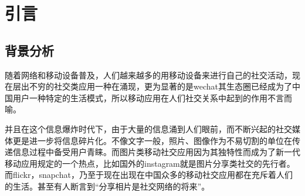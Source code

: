 
\chapter{引言}
\section{背景分析}
随着网络和移动设备普及，人们越来越多的用移动设备来进行自己的社交活动，现在层出不穷的社交类应用一种在涌现，更为显著的是wechat其生态圈已经成为了中国用户一种特定的生活模式，所以移动应用在人们社交关系中起到的作用不言而喻。

并且在这个信息爆炸时代下，由于大量的信息涌到人们眼前，而不断兴起的社交媒体更是进一步将信息碎片化。不像文字一般，照片、图像作为不易切割的单位在传递信息过程中备受用户青睐。而图片类移动社交应用因为其独特性而成为了新一代移动应用规定的一个热点，比如国外的instagram就是图片分享类社交的先行者。而flickr，snapchat，乃至于现在出现在中国众多的移动社交应用都在充斥着人们的生活。甚至有人断言到“分享相片是社交网络的将来”。






